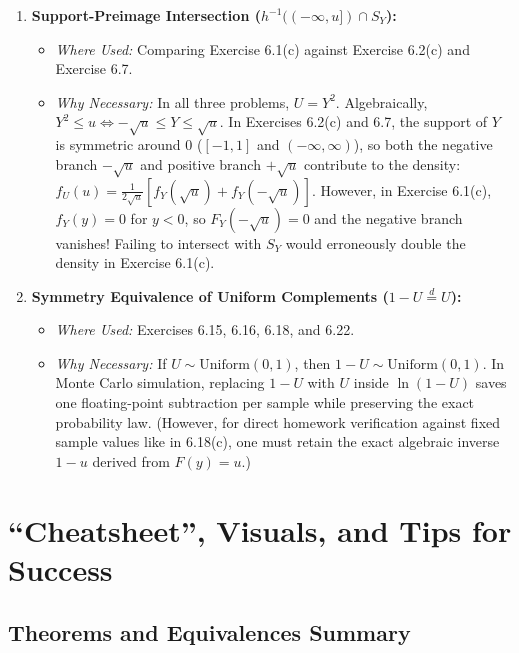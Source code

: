 \documentclass[11pt, letterpaper]{article}
\theoremstyle{definition}
\theoremstyle{remark}
\begin{document}
\begin{enumerate}
    \item \textbf{Support-Preimage Intersection ($h^{-1}((-\infty, u]) \cap S_Y$):}
    \begin{itemize}
        \item \textit{Where Used:} Comparing Exercise 6.1(c) against Exercise 6.2(c) and Exercise 6.7.
        \item \textit{Why Necessary:} In all three problems, $U = Y^2$. Algebraically, $Y^2 \le u \iff -\sqrt{u} \le Y \le \sqrt{u}$. In Exercises 6.2(c) and 6.7, the support of $Y$ is symmetric around $0$ ($[-1, 1]$ and $(-\infty, \infty)$), so both the negative branch $-\sqrt{u}$ and positive branch $+\sqrt{u}$ contribute to the density: $f_U(u) = \frac{1}{2\sqrt{u}}[f_Y(\sqrt{u}) + f_Y(-\sqrt{u})]$. However, in Exercise 6.1(c), $f_Y(y) = 0$ for $y < 0$, so $F_Y(-\sqrt{u}) = 0$ and the negative branch vanishes! Failing to intersect with $S_Y$ would erroneously double the density in Exercise 6.1(c).
    \end{itemize}

    \item \textbf{Symmetry Equivalence of Uniform Complements ($1 - U \stackrel{d}{=} U$):}
    \begin{itemize}
        \item \textit{Where Used:} Exercises 6.15, 6.16, 6.18, and 6.22.
        \item \textit{Why Necessary:} If $U \sim \text{Uniform}(0, 1)$, then $1 - U \sim \text{Uniform}(0, 1)$. In Monte Carlo simulation, replacing $1 - U$ with $U$ inside $\ln(1 - U)$ saves one floating-point subtraction per sample while preserving the exact probability law. (However, for direct homework verification against fixed sample values like in 6.18(c), one must retain the exact algebraic inverse $1 - u$ derived from $F(y) = u$.)
    \end{itemize}
\end{enumerate}

\newpage
\section{``Cheatsheet'', Visuals, and Tips for Success}

\subsection{Theorems and Equivalences Summary}
\end{document}
